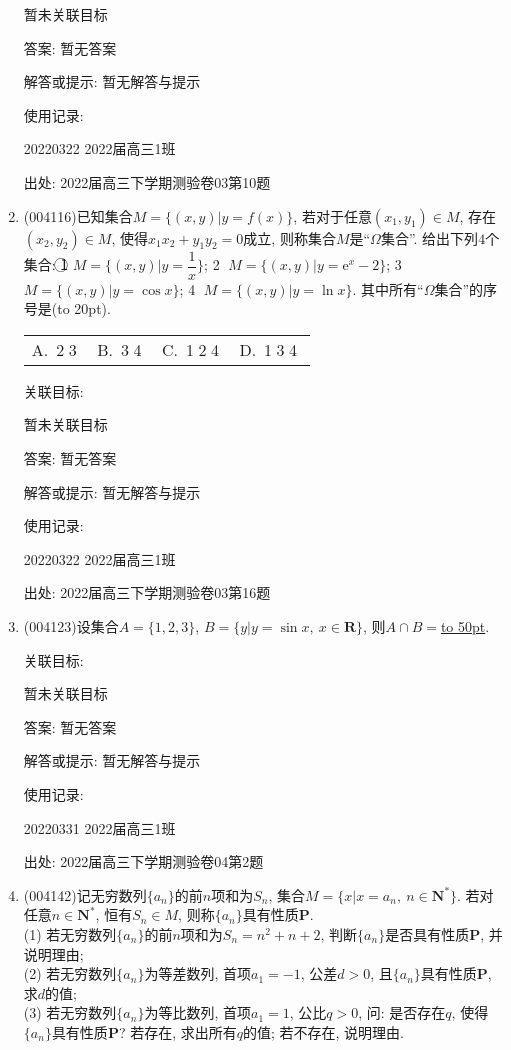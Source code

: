 \documentclass[10pt,a4paper]{article}
\newcommand{\blank}[1]{\underline{\hbox to #1pt{}}}
\newcommand{\bracket}[1]{(\hbox to #1pt{})}
\newcommand{\fourch}[4]{\par\begin{tabular}{p{.23\textwidth}p{.23\textwidth}p{.23\textwidth}p{.23\textwidth}}
A.~#1 &B.~#2& C.~#3& D.~#4
\end{tabular}}
\begin{document}
\begin{enumerate}[1.]
暂未关联目标

答案: 暂无答案

解答或提示: 暂无解答与提示

使用记录:

20220322	2022届高三1班	


出处: 2022届高三下学期测验卷03第10题
\item { (004116)}已知集合$M=\{(x,y)|y=f(x)\}$, 若对于任意$(x_1,y_1)\in M$, 存在$(x_2,y_2)\in M$, 使得$x_1x_2+y_1y_2=0$成立, 则称集合$M$是``$\Omega$集合''. 给出下列$4$个集合:
\textcircled{1} $M=\{(x,y) |y=\dfrac 1x \}$; \textcircled{2} $M=\{(x,y)|y=\mathrm{e}^x-2\}$; \textcircled{3} $M=\{(x,y)|y=\cos x\}$; \textcircled{4} $M=\{(x,y)|y=\ln x\}$.
其中所有``$\Omega$集合''的序号是\bracket{20}.
\fourch{\textcircled{2}\textcircled{3}}{\textcircled{3}\textcircled{4}}{\textcircled{1}\textcircled{2}\textcircled{4}}{\textcircled{1}\textcircled{3}\textcircled{4}}


关联目标:

暂未关联目标

答案: 暂无答案

解答或提示: 暂无解答与提示

使用记录:

20220322	2022届高三1班	


出处: 2022届高三下学期测验卷03第16题
\item { (004123)}设集合$A=\{1,2,3\}$, $B=\{y|y=\sin x, \ x\in \mathbf{R}\}$, 则$A\cap B=$\blank{50}.


关联目标:

暂未关联目标

答案: 暂无答案

解答或提示: 暂无解答与提示

使用记录:

20220331	2022届高三1班	


出处: 2022届高三下学期测验卷04第2题
\item { (004142)}记无穷数列$\{a_n\}$的前$n$项和为$S_n$, 集合$M=\{x|x=a_n, \ n\in \mathbf{N}^*\}$. 若对任意$n\in \mathbf{N}^*$, 恒有$S_n\in M$, 则称$\{a_n\}$具有性质$\mathbf{P}$.\\
(1) 若无穷数列$\{a_n\}$的前$n$项和为$S_n=n^2+n+2$, 判断$\{a_n\}$是否具有性质$\mathbf{P}$, 并说明理由;\\
(2) 若无穷数列$\{a_n\}$为等差数列, 首项$a_1=-1$, 公差$d>0$, 且$\{a_n\}$具有性质$\mathbf{P}$, 求$d$的值;\\
(3) 若无穷数列$\{a_n\}$为等比数列, 首项$a_1=1$, 公比$q>0$, 问: 是否存在$q$, 使得$\{a_n\}$具有性质$\mathbf{P}$? 若存在, 求出所有$q$的值; 若不存在, 说明理由.



\end{enumerate}
\end{document}
